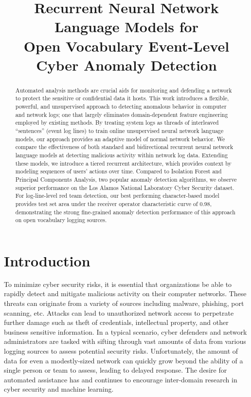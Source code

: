 \documentclass[letterpaper]{article} %
\title{Recurrent Neural Network Language Models for\\Open Vocabulary Event-Level Cyber Anomaly Detection}
\author{Aaron Tuor,\textsuperscript{1}
Ryan Baerwolf,\textsuperscript{2}
Nicolas Knowles,\textsuperscript{2}\\
{\bf \Large Brian Hutchinson,\textsuperscript{1,2}
Nicole Nichols\textsuperscript{1} \and
Robert Jasper\textsuperscript{1}}\\
\textsuperscript{1}Pacific Northwest National Laboratory\\Richland, Washington\\
\textsuperscript{2}Western Washington University\\Bellingham, Washington}
\begin{document}
\maketitle

\begin{abstract} 
 	Automated analysis methods are crucial aids for monitoring and defending a network to protect the sensitive or confidential data it hosts.  
    This work introduces a flexible, powerful, and unsupervised approach to detecting anomalous behavior in computer and network logs; 
    one that largely eliminates domain-dependent feature engineering employed by existing methods.  
    By treating system logs as threads of interleaved ``sentences'' (event log lines) to train online unsupervised neural network language models, our approach provides an adaptive model of normal network behavior.
    We compare the effectiveness of both standard and bidirectional recurrent neural network language models at detecting malicious activity within network log data.
    Extending these models, we introduce a tiered recurrent architecture, which provides context by modeling sequences of users' actions over time.
    Compared to Isolation Forest and Principal Components Analysis, two popular anomaly detection algorithms, we observe superior performance on the Los Alamos National Laboratory Cyber Security dataset. 
    For log-line-level red team detection, our best performing character-based model provides test set area under the receiver operator characteristic curve of 0.98, demonstrating the strong fine-grained anomaly detection performance of this approach on open vocabulary logging sources.
\end{abstract}

\section{Introduction}

To minimize cyber security risks, it is essential that organizations be able to rapidly detect and mitigate malicious activity on their computer networks.
These threats can originate from a variety of sources including malware, phishing, port scanning, etc.  
Attacks can lead to unauthorized network access to perpetrate further damage such as theft of credentials, intellectual property, and other business sensitive information.
In a typical scenario, cyber defenders and network administrators are tasked with sifting through vast amounts of data from various logging sources to assess potential security risks.
Unfortunately, the amount of data for even a modestly-sized network can quickly grow beyond the ability of a single person or team to assess, leading to delayed response. 
The desire for automated assistance has and continues to encourage inter-domain research in cyber security and machine learning.
\end{document}
